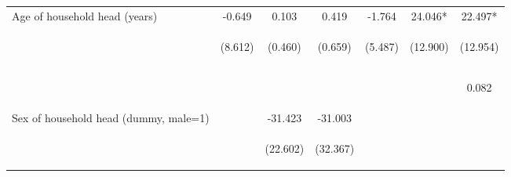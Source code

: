 \begin{center}
\begin{tabular}{lcccccc}
Age of household head (years) & -0.649 & 0.103 & 0.419 & -1.764 & 24.046* & 22.497* \\
 & \begin{footnotesize}(8.612)\end{footnotesize} & \begin{footnotesize}(0.460)\end{footnotesize} & \begin{footnotesize}(0.659)\end{footnotesize} & \begin{footnotesize}(5.487)\end{footnotesize} & \begin{footnotesize}(12.900)\end{footnotesize} & \begin{footnotesize}(12.954)\end{footnotesize} \\
\vspace{4pt} & \begin{footnotesize}[0.940]\end{footnotesize} & \begin{footnotesize}[0.823]\end{footnotesize} & \begin{footnotesize}[0.525]\end{footnotesize} & \begin{footnotesize}[0.748]\end{footnotesize} & \begin{footnotesize}[0.062]\end{footnotesize} & \begin{footnotesize}0.082\end{footnotesize} \\
Sex of household head (dummy, male=1) &  & -31.423 & -31.003 &  &  &  \\
 & \begin{footnotesize}\end{footnotesize} & \begin{footnotesize}(22.602)\end{footnotesize} & \begin{footnotesize}(32.367)\end{footnotesize} & \begin{footnotesize}\end{footnotesize} & \begin{footnotesize}\end{footnotesize} & \begin{footnotesize}\end{footnotesize} \\

\end{tabular}
\end{center}
